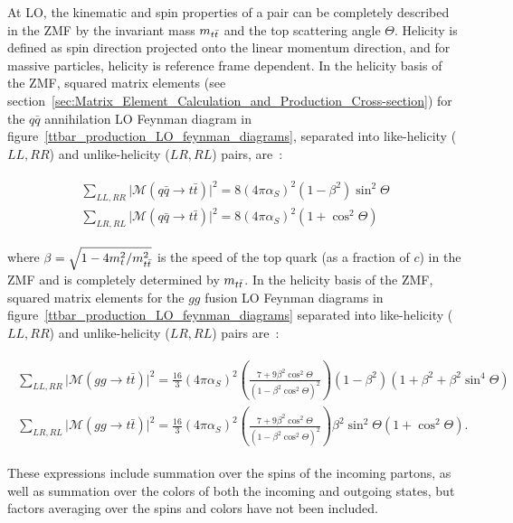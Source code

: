 \begin{refsection}
At LO, the kinematic and spin properties of a \ttbar pair can be completely described in the \ttbar ZMF by the invariant mass $m_{t\bar{t}}$ and the top scattering angle $\Theta$.
Helicity is defined as spin direction projected onto the linear momentum direction, and for massive particles, helicity is reference frame dependent.
In the helicity basis of the \ttbar ZMF, squared matrix elements (see section~\ref{sec:Matrix_Element_Calculation_and_Production_Cross-section}) for the $q\bar{q}$ annihilation LO Feynman diagram in figure~\ref{ttbar_production_LO_feynman_diagrams}, separated into like-helicity ($L L, R R$) and unlike-helicity ($L R, R L$) \ttbar pairs, are~\cite{PhysRevD.53.4886}:
\begin{linenomath*}
\begin{align}
\begin{array}{c}
\sum_{L L, R R}\vert\mathcal{M}(q \bar{q} \rightarrow t \bar{t})\vert^2=8 (4 \pi \alpha_S)^2 \left(1-\beta^2\right) \sin ^2 \Theta \\
\sum_{L R, R L}\vert\mathcal{M}(q \bar{q} \rightarrow t \bar{t})\vert^2=8 (4 \pi \alpha_S)^2 \left(1+\cos ^2 \Theta\right)
\end{array}
\label{qq_matrix_elements}
\end{align}
\end{linenomath*}
where $\beta=\sqrt{1-4 m_t^2 / m_{t\bar{t}}^2}$ is the speed of the top quark (as a fraction of $c$) in the \ttbar ZMF and is completely determined by $m_{t\bar{t}}$.
In the helicity basis of the \ttbar ZMF, squared matrix elements for the $gg$ fusion LO Feynman diagrams in figure~\ref{ttbar_production_LO_feynman_diagrams} separated into like-helicity ($L L, R R$) and unlike-helicity ($L R, R L$) \ttbar pairs are~\cite{PhysRevD.53.4886}:
\begin{linenomath*}
\begin{align}
\begin{array}{c}
\sum_{L L, R R}\vert\mathcal{M}(g g \rightarrow t \bar{t})\vert^2=\frac{16}{3} (4 \pi \alpha_S)^2 (\frac{7+9 \beta^2 \cos ^2 \Theta}{\left(1-\beta^2 \cos ^2 \Theta\right)^2}) \left(1-\beta^2\right)\left(1+\beta^2+\beta^2 \sin ^4 \Theta\right) \\
\sum_{L R, R L}\vert\mathcal{M}(g g \rightarrow t \bar{t})\vert^2=\frac{16}{3} (4 \pi \alpha_S)^2 (\frac{7+9 \beta^2 \cos ^2 \Theta}{\left(1-\beta^2 \cos ^2 \Theta\right)^2}) \beta^2 \sin ^2 \Theta\left(1+\cos ^2 \Theta\right).
\end{array}
\label{gg_matrix_elements}
\end{align}
\end{linenomath*}
These expressions include summation over the spins of the incoming partons, as well as summation over the colors of both the incoming and outgoing states, but factors averaging over the spins and colors have not been included.


\end{refsection}
